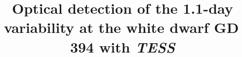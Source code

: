 \documentclass{aastex63}
\begin{document}

\title{Optical detection of the 1.1-day variability at the white dwarf GD\,394 with \textit{TESS}}




\end{document}
